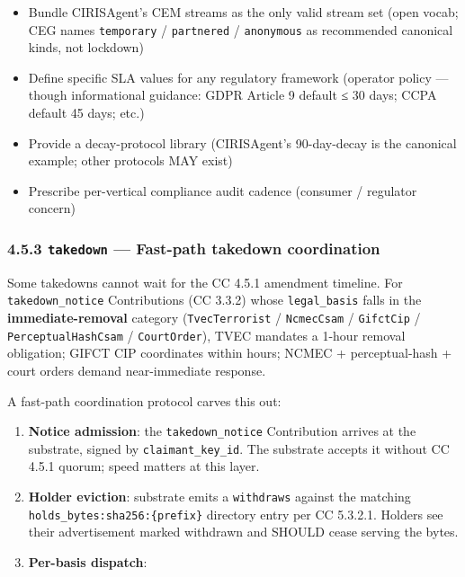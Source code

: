\documentclass[11pt]{article}
\begin{document}
\begin{itemize}\setlength\itemsep{0pt}
\item Bundle CIRISAgent's CEM streams as the only valid stream set (open vocab; CEG names \texttt{temporary} / \texttt{partnered} / \texttt{anonymous} as recommended canonical kinds, not lockdown)
\item Define specific SLA values for any regulatory framework (operator policy — though informational guidance: GDPR Article 9 default ≤ 30 days; CCPA default 45 days; etc.)
\item Provide a decay-protocol library (CIRISAgent's 90-day-decay is the canonical example; other protocols MAY exist)
\item Prescribe per-vertical compliance audit cadence (consumer / regulator concern)
\end{itemize}


\subsubsection*{4.5.3 \texttt{takedown} — Fast-path takedown coordination}


Some takedowns cannot wait for the CC 4.5.1 amendment timeline. For \texttt{takedown\_notice} Contributions (CC 3.3.2) whose \texttt{legal\_basis} falls in the \textbf{immediate-removal} category (\texttt{TvecTerrorist} / \texttt{NcmecCsam} / \texttt{GifctCip} / \texttt{PerceptualHashCsam} / \texttt{CourtOrder}), TVEC mandates a 1-hour removal obligation; GIFCT CIP coordinates within hours; NCMEC + perceptual-hash + court orders demand near-immediate response.


A fast-path coordination protocol carves this out:


\begin{enumerate}\setlength\itemsep{0pt}
\item \textbf{Notice admission}: the \texttt{takedown\_notice} Contribution arrives at the substrate, signed by \texttt{claimant\_key\_id}. The substrate accepts it without CC 4.5.1 quorum; speed matters at this layer.
\item \textbf{Holder eviction}: substrate emits a \texttt{withdraws} against the matching \texttt{holds\_bytes:sha256:\{prefix\}} directory entry per CC 5.3.2.1. Holders see their advertisement marked withdrawn and SHOULD cease serving the bytes.
\item \textbf{Per-basis dispatch}:
\end{enumerate}
\end{document}
